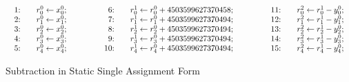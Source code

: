 \begin{figure}
  \centering
  \[
  \begin{array}{lclcl}
    \begin{array}{rcl}
    \textmd{1:} && {r}^0_0 \leftarrow {x}^0_0; \\
    \textmd{2:} && {r}^0_1 \leftarrow {x}^0_1; \\
    \textmd{3:} && {r}^0_2 \leftarrow {x}^0_2; \\
    \textmd{4:} && {r}^0_3 \leftarrow {x}^0_3; \\
    \textmd{5:} && {r}^0_4 \leftarrow {x}^0_4; \\
    \end{array}
    &\hspace{.05\textwidth}&
    \begin{array}{rcl}
    \textmd{6:} && 
      {r}^1_0 \leftarrow {r}^0_0 + {4503599627370458}; \\
    \textmd{7:} &&
      {r}^1_1 \leftarrow {r}^0_1 + {4503599627370494}; \\
    \textmd{8:} &&
      {r}^1_2 \leftarrow {r}^0_2 + {4503599627370494}; \\
    \textmd{9:} &&
      {r}^1_3 \leftarrow {r}^0_3 + {4503599627370494}; \\
    \textmd{10:} && 
      {r}^1_4 \leftarrow {r}^0_4 + {4503599627370494};\\
    \end{array}
    &\hspace{.05\textwidth}&
    \begin{array}{rcl}
    \textmd{11:} && {r}^2_0 \leftarrow {r}^1_0 - {y}^0_0; \\
    \textmd{12:} && {r}^2_1 \leftarrow {r}^1_1 - {y}^0_1; \\
    \textmd{13:} && {r}^2_2 \leftarrow {r}^1_2 - {y}^0_2; \\
    \textmd{14:} && {r}^2_3 \leftarrow {r}^1_3 - {y}^0_3; \\
    \textmd{15:} && {r}^2_4 \leftarrow {r}^1_4 - {y}^0_4;
    \end{array}
  \end{array}
  \]
  \caption{Subtraction  in Static Single Assignment Form}
  \label{figure:translation:subtraction-ssa}
\end{figure}

